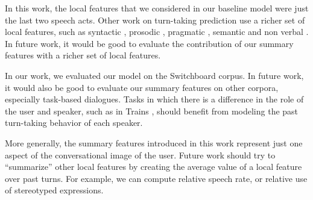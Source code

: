 In this work, the local features that we considered in our baseline model were just the last two speech acts.  Other work on turn-taking prediction use a richer set of local features, such as
%
syntactic \cite{ duncan1972some, sacks1974simplest, ford1996interactional, de2006projecting, magyari2012prediction, atterer2008towards}, prosodic \cite{ duncan1972some, ford1996interactional, shriberg2000prosody, ferrer2003prosody, de2006projecting, reed2009units, raux2012optimizing, hariharan2001robust, atterer2008towards}, pragmatic \cite{ ford1996interactional, garrod2015use, raux2012optimizing}, semantic \cite{raux2012optimizing} and non verbal \cite{kendon1967some}. In future work, it would be good to evaluate the contribution of our summary features with a richer set of local features.

In our work, we evaluated our model on the Switchboard corpus.  In future work, it would also be good to evaluate our summary features on other corpora, especially task-based dialogues.  Tasks in which there is a difference in the role of the user and speaker, such as in Trains \cite{HeemanAllen95:cdrom}, should benefit from modeling the past turn-taking behavior of each speaker.

More generally, the summary features introduced in this work represent just one aspect of the conversational image of the user. Future work should try to ``summarize'' other local features by creating
the average value of a local feature over past turns. For example, we can compute relative speech rate, or relative use of stereotyped expressions.
